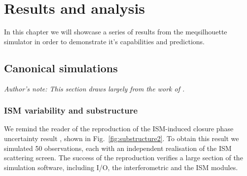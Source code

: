 \chapter{Results and analysis}
In this chapter we will showcase a series of results from the {\sc meqsilhouette} simulator in order to demonstrate it's capabilities and predictions.


\section{Canonical simulations}\label{sec:can_sim}
{\it Author's note: This section draws largely from the work of \citet{Blecher_2016}.}

\subsection{ISM variability and substructure}
We remind the reader of the reproduction of the ISM-induced closure phase uncertainty result \citep{Ortiz_2016}, shown in Fig.~\ref{fig:substructure2}. To obtain this result we simulated 50 observations, each with an independent realisation of the ISM scattering screen. The success of the reproduction verifies a large section of the simulation software, including I/O, the interferometric and the ISM modules. 

